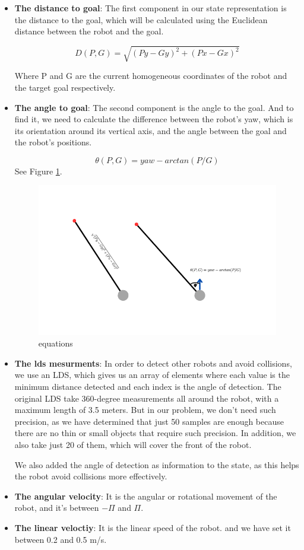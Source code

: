 \documentclass[12pt]{extarticle}
\begin{document}
\begin{itemize}
\item \textbf{The distance to goal}: 
The first component in our state representation is the distance to the goal, which will be calculated using the Euclidean distance between the robot and the goal.

\[ D(P,G)=\sqrt{(Py-Gy)^2+(Px-Gx)^2}  \] 

Where P and G are the current homogeneous coordinates of the robot and the target goal respectively.

\item \textbf{The angle to goal}: 
The second component is the angle to the goal. And to find it, we need to calculate the difference between the robot's yaw, which is its orientation around its vertical axis, and the angle between the goal and the robot's positions.


\[ \theta(P,G)=yaw-arctan(P/G)  \] 
See Figure \ref{fig:equations}.
 \begin{figure}[H]  
\centering
\includegraphics[scale=0.8]{equations}
\caption[equations]{equations}
\label{fig:equations}
\end{figure}


\item \textbf{The lds  mesurments}: 
In order to detect other robots and avoid collisions, we use an LDS, which gives us an array of elements where each value is the minimum distance detected and each index is the angle of detection.
The original LDS take 360-degree measurements all around the robot, with a maximum length of 3.5 meters. But in our problem, we don't need such precision, as we have determined that just 50 samples are enough because there are no thin or small objects that require such precision. In addition, we also take just 20 of them, which will cover the front of the robot.

We also added the angle of detection as information to the state, as this helps the robot avoid collisions more effectively.

\item \textbf{The angular velocity}: 
It is the angular or rotational movement of the robot, and it's between 
$ -\Pi $ and $\Pi$.

\item \textbf{The linear veloctiy}: 
It is the linear speed of the robot. and we have set it between 0.2 and 0.5 m/s.

\end{itemize}
\end{document}
